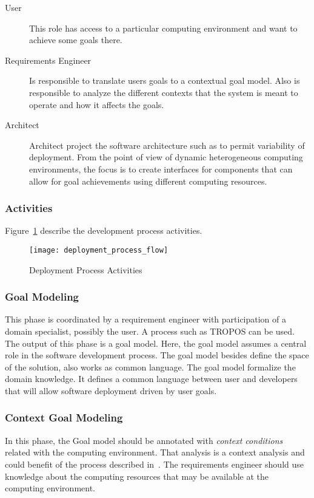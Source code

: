 \begin{description}
  \item[User]
  This role has access to a particular computing environment and want to achieve some goals there.
  \item[Requirements Engineer]
  Is responsible to translate users goals to a contextual goal model. Also is responsible to analyze the different contexts that the system is meant to operate and how it affects the goals.
  \item[Architect] Architect project the software architecture such as to permit variability of deployment.
  From the point of view of dynamic heterogeneous computing environments, the focus is to create interfaces for components that can allow for goal achievements using different computing resources.

\end{description}



\subsubsection{Activities}

Figure~\ref{fig:deployment_process_flow} describe the development process activities.

\label{sub:Proposal}
\begin{figure}[!htb]
  \centering
  \texttt{[image: deployment\_process\_flow]}
  \caption{Deployment Process Activities}
\label{fig:deployment_process_flow}
\end{figure}

\subsubsection{Goal Modeling}
This phase is coordinated by a requirement engineer with participation of a domain specialist, possibly the user.
A process such as TROPOS can be used. The output of this phase is a goal model.
Here, the goal model assumes a central role in the software development process. The goal model besides define the space of the solution, also works as common language. The goal model formalize the domain knowledge. It defines a common language between user and developers that will allow software deployment driven by user goals.


\subsubsection{Context Goal Modeling}
In this phase, the Goal model should be annotated with \emph{context conditions} related with the computing environment. That analysis is a context analysis and could benefit of the process described in~\cite{ali_goal-based_2010}. The requirements engineer should use knowledge about the computing resources that may be available at the computing environment.


